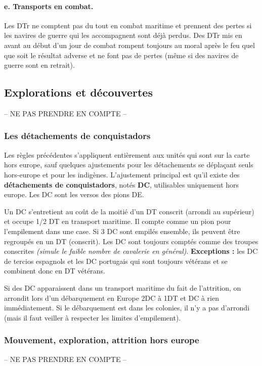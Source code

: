 \paragraph{e. Transports en combat.}
Les DTr ne comptent pas du tout en combat maritime et prennent des pertes si les
navires de guerre qui les accompagnent sont déjà perdus.
Des DTr mis en avant au début d'un jour de combat rompent toujours au moral
après le feu quel que soit le résultat adverse et ne font pas de pertes (même si des
navires de guerre sont en retrait).


\subsection{Explorations et découvertes}
-- NE PAS PRENDRE EN COMPTE --

\subsubsection{Les détachements de conquistadors}
Les règles précédentes s'appliquent entièrement aux unités qui sont sur la carte hors europe,
sauf quelques ajustements pour les détachements se déplaçant seuls hors-europe et pour les indigènes.
L'ajustement principal est qu'il existe des \textbf{détachements de conquistadors},
notés {\bf DC}, utilisables
uniquement hors europe. Les DC sont les versos des pions DE.

Un DC s'entretient au coût de la moitié d'un DT conscrit (arrondi au supérieur) et
occupe 1/2 DT en transport maritime. Il compte comme un pion pour
l'empilement dans une case. Si 3 DC sont empilés ensemble, ils peuvent
être regroupés en un DT (conscrit). Les DC sont toujours comptés comme des troupes
conscrites \textit{(simule le faible nombre de cavalerie en général)}.
\textbf{Exceptions :}
les DC de tercios espagnols et les DC portugais qui sont toujours vétérans et
se combinent donc en DT vétérans.

Si des DC apparaissent dans un transport maritime du fait de l'attrition, on arrondit
lors d'un débarquement en Europe 2DC à 1DT et DC à rien immédiatement. Si le débarquement
est dans les colonies, il n'y a pas d'arrondi (mais il faut veiller à respecter les limites
d'empilement).


\subsubsection{Mouvement, exploration, attrition hors europe}
-- NE PAS PRENDRE EN COMPTE --


